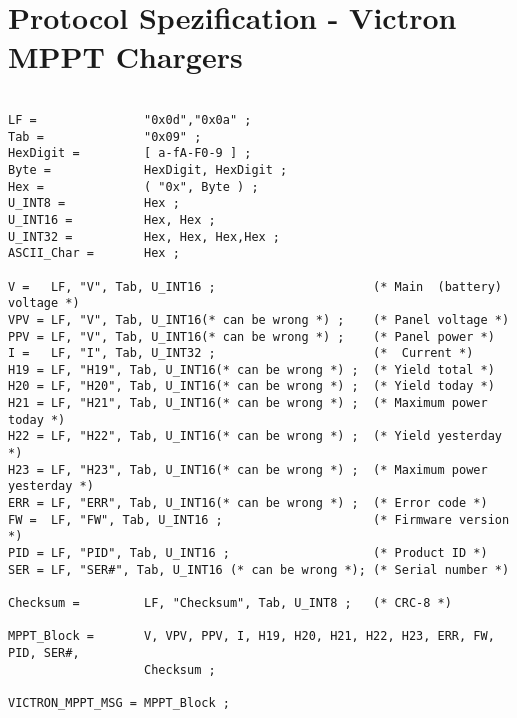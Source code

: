 \section{Protocol Spezification - Victron MPPT Chargers}
\label{VICTRONMPPTEBNF}

\begin{verbatim}

LF =               "0x0d","0x0a" ;
Tab =              "0x09" ;
HexDigit =         [ a-fA-F0-9 ] ;
Byte =             HexDigit, HexDigit ;
Hex =              ( "0x", Byte ) ;
U_INT8 =           Hex ;
U_INT16 =          Hex, Hex ;
U_INT32 =          Hex, Hex, Hex,Hex ;
ASCII_Char =       Hex ;

V =   LF, "V", Tab, U_INT16 ;                      (* Main  (battery) voltage *)
VPV = LF, "V", Tab, U_INT16(* can be wrong *) ;    (* Panel voltage *)
PPV = LF, "V", Tab, U_INT16(* can be wrong *) ;    (* Panel power *)
I =   LF, "I", Tab, U_INT32 ;                      (*  Current *)
H19 = LF, "H19", Tab, U_INT16(* can be wrong *) ;  (* Yield total *)
H20 = LF, "H20", Tab, U_INT16(* can be wrong *) ;  (* Yield today *)
H21 = LF, "H21", Tab, U_INT16(* can be wrong *) ;  (* Maximum power today *)
H22 = LF, "H22", Tab, U_INT16(* can be wrong *) ;  (* Yield yesterday *)
H23 = LF, "H23", Tab, U_INT16(* can be wrong *) ;  (* Maximum power yesterday *)
ERR = LF, "ERR", Tab, U_INT16(* can be wrong *) ;  (* Error code *)
FW =  LF, "FW", Tab, U_INT16 ;                     (* Firmware version *)
PID = LF, "PID", Tab, U_INT16 ;                    (* Product ID *)
SER = LF, "SER#", Tab, U_INT16 (* can be wrong *); (* Serial number *)

Checksum =         LF, "Checksum", Tab, U_INT8 ;   (* CRC-8 *)

MPPT_Block =       V, VPV, PPV, I, H19, H20, H21, H22, H23, ERR, FW, PID, SER#,
                   Checksum ;

VICTRON_MPPT_MSG = MPPT_Block ;
\end{verbatim}
\newpage


